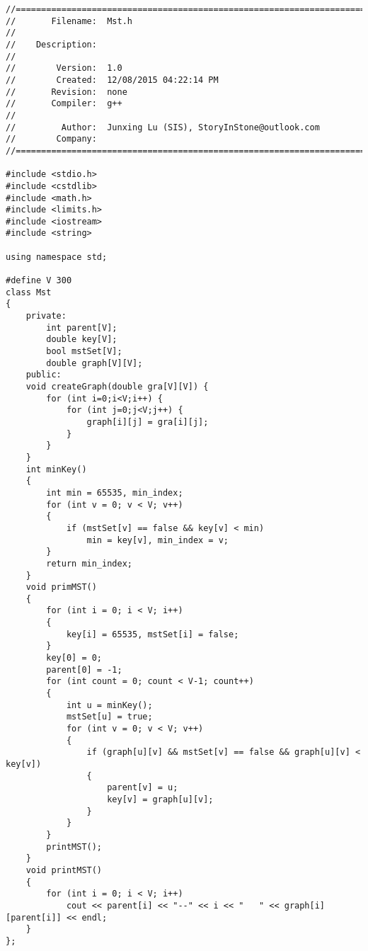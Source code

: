 \begin{lstlisting}[caption={Mst.h},label=Mst]
//=======================================================================
//       Filename:  Mst.h
// 
//    Description:  
// 
//        Version:  1.0
//        Created:  12/08/2015 04:22:14 PM
//       Revision:  none
//       Compiler:  g++
// 
//         Author:  Junxing Lu (SIS), StoryInStone@outlook.com
//        Company:  
//=======================================================================

#include <stdio.h>
#include <cstdlib>
#include <math.h>
#include <limits.h>
#include <iostream>
#include <string>

using namespace std;

#define V 300
class Mst
{
    private:
        int parent[V];
        double key[V];
        bool mstSet[V];
        double graph[V][V];
    public:
    void createGraph(double gra[V][V]) {
        for (int i=0;i<V;i++) {
            for (int j=0;j<V;j++) {
                graph[i][j] = gra[i][j];
            }
        }
    }
    int minKey()
    {
        int min = 65535, min_index;
        for (int v = 0; v < V; v++)
        {
            if (mstSet[v] == false && key[v] < min)
                min = key[v], min_index = v;
        }
        return min_index;
    }
    void primMST()
    {
        for (int i = 0; i < V; i++)
        {
            key[i] = 65535, mstSet[i] = false;
        }
        key[0] = 0;
        parent[0] = -1;
        for (int count = 0; count < V-1; count++)
        {
            int u = minKey();
            mstSet[u] = true;
            for (int v = 0; v < V; v++)
            {
                if (graph[u][v] && mstSet[v] == false && graph[u][v] < key[v])
                {
                    parent[v] = u;
                    key[v] = graph[u][v];
                }
            }
        }
        printMST();
    }
    void printMST()
    {
        for (int i = 0; i < V; i++)
            cout << parent[i] << "--" << i << "   " << graph[i][parent[i]] << endl;
    }
};
\end{lstlisting}
\newpage

